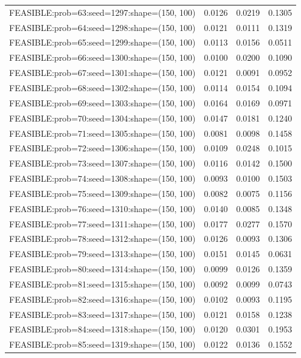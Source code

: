 \begin{longtable}{lccc}
FEASIBLE:prob=63:seed=1297:shape=(150, 100)  & 0.0126 & 0.0219 & 0.1305 \\
FEASIBLE:prob=64:seed=1298:shape=(150, 100)  & 0.0121 & 0.0111 & 0.1319 \\
FEASIBLE:prob=65:seed=1299:shape=(150, 100)  & 0.0113 & 0.0156 & 0.0511 \\
FEASIBLE:prob=66:seed=1300:shape=(150, 100)  & 0.0100 & 0.0200 & 0.1090 \\
FEASIBLE:prob=67:seed=1301:shape=(150, 100)  & 0.0121 & 0.0091 & 0.0952 \\
FEASIBLE:prob=68:seed=1302:shape=(150, 100)  & 0.0114 & 0.0154 & 0.1094 \\
FEASIBLE:prob=69:seed=1303:shape=(150, 100)  & 0.0164 & 0.0169 & 0.0971 \\
FEASIBLE:prob=70:seed=1304:shape=(150, 100)  & 0.0147 & 0.0181 & 0.1240 \\
FEASIBLE:prob=71:seed=1305:shape=(150, 100)  & 0.0081 & 0.0098 & 0.1458 \\
FEASIBLE:prob=72:seed=1306:shape=(150, 100)  & 0.0109 & 0.0248 & 0.1015 \\
FEASIBLE:prob=73:seed=1307:shape=(150, 100)  & 0.0116 & 0.0142 & 0.1500 \\
FEASIBLE:prob=74:seed=1308:shape=(150, 100)  & 0.0093 & 0.0100 & 0.1503 \\
FEASIBLE:prob=75:seed=1309:shape=(150, 100)  & 0.0082 & 0.0075 & 0.1156 \\
FEASIBLE:prob=76:seed=1310:shape=(150, 100)  & 0.0140 & 0.0085 & 0.1348 \\
FEASIBLE:prob=77:seed=1311:shape=(150, 100)  & 0.0177 & 0.0277 & 0.1570 \\
FEASIBLE:prob=78:seed=1312:shape=(150, 100)  & 0.0126 & 0.0093 & 0.1306 \\
FEASIBLE:prob=79:seed=1313:shape=(150, 100)  & 0.0151 & 0.0145 & 0.0631 \\
FEASIBLE:prob=80:seed=1314:shape=(150, 100)  & 0.0099 & 0.0126 & 0.1359 \\
FEASIBLE:prob=81:seed=1315:shape=(150, 100)  & 0.0092 & 0.0099 & 0.0743 \\
FEASIBLE:prob=82:seed=1316:shape=(150, 100)  & 0.0102 & 0.0093 & 0.1195 \\
FEASIBLE:prob=83:seed=1317:shape=(150, 100)  & 0.0121 & 0.0158 & 0.1238 \\
FEASIBLE:prob=84:seed=1318:shape=(150, 100)  & 0.0120 & 0.0301 & 0.1953 \\
FEASIBLE:prob=85:seed=1319:shape=(150, 100)  & 0.0122 & 0.0136 & 0.1552 \\

\end{longtable}
